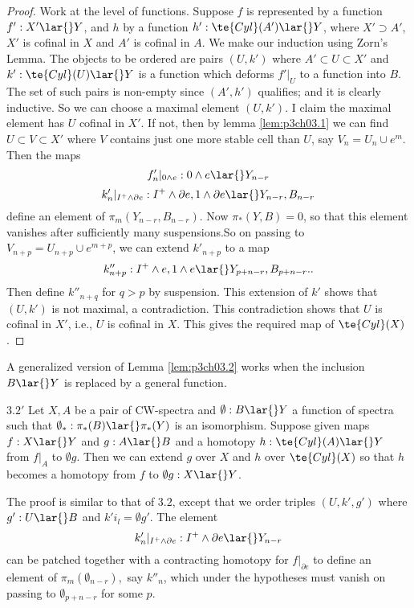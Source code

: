 \documentclass[../main]{subfiles}
\begin{document}
\begin{proof}
Work at the level of functions. Suppose $f$ is represented by a function $f':X'\lar{}Y$, and $h$ by a function $h':\te{Cyl}(A')\lar{}Y$, where $X'\supset A'$, $X'$ is cofinal in $X$ and $A'$ is cofinal in $A$. We make our induction using Zorn's Lemma. The objects to be ordered are pairs $(U,k')$ where $A'\subset U\subset X'$ and $k':\te{Cyl}(U)\lar{} Y$ is a function which deforms $f'|_U$ to a function into $B$. 
The set of such pairs is non-empty since $(A',h')$ qualifies; and it is clearly inductive. So we can choose a
maximal element $(U,k')$. I claim the maximal element has $U$ cofinal
in $X'$. If not, then by lemma \ref{lem:p3ch03.1} we can find $U\subset V\subset X'$ where $V$ contains just one more stable cell than $U$, say $V_n=U_n\cup e^m$. Then the maps \[f'_n|_{0\wedge e}: 0\wedge e\lar{} Y_{n-r} \]
\[k_n'|_{I^+ \wedge \partial e}: I^+ \wedge \partial e, 1\wedge \partial e\lar{} Y_{n-r},B_{n-r} \]
define an element of $\pi_m(Y_{n-r},B_{n-r})$. Now $\pi_\ast(Y,B)=0$, so that this element vanishes after sufficiently many suspensions.So on passing to $V_{n+p}= U_{n+p}\cup e^{m+p}$, we can extend $k'_{n+p}$ to a map \[k''_{n+p}: I^+\wedge e, 1\wedge e \lar{} Y_{p+n-r},B_{p+n-r}.. \]
Then define $k''_{n+q}$ for $q>p$ by suspension. This extension of $k'$ shows that $(U,k')$ is not maximal, a contradiction. This contradiction shows that $U$ is cofinal in $X'$, i.e., $U$ is cofinal in $X$. This gives the required map of $\te{Cyl}(X)$.
\end{proof}
A generalized version of Lemma \ref{lem:p3ch03.2} works when the inclusion $B\lar{}Y$ is replaced by a general function. 

\begin{customlemma}{$3.2'$} \label{lem:p3ch03.2'}
Let $X,A$ be a pair of CW-spectra and $\emptyset: B\lar{}  Y$ a function of spectra such that $\emptyset_\ast:\pi_\ast (B)\lar{}\pi_\ast(Y)$ is an isomorphism. Suppose given maps $f:X\lar{}Y$ and $g:A\lar{}B$ and a homotopy $h:\te{Cyl}(A)\lar{}Y$ from $f|_A$ to $\emptyset g$. Then we can extend $g$ over $X$ and $h$ over $\te{Cyl}(X)$ so that $h$ becomes a homotopy from $f$ to $\emptyset g:X\lar{}Y$.
\end{customlemma}
The proof is similar to that of $3.2$, except that we order triples $(U,k',g')$ where $g':U\lar{}B$ and $k' i_l = \emptyset g'$. The element \[k'_n|_{I^+\wedge \partial e}: I^+\wedge \partial e\lar{} Y_{n-r}\]
can be patched together with a contracting homotopy for $f|_{\partial e}$ to define an element of $\pi_m(\emptyset_{n-r}),$ say $k''_n$, which under the hypotheses must vanish on passing to $\emptyset_{p+n-r}$ for some $p$.
\end{document}
